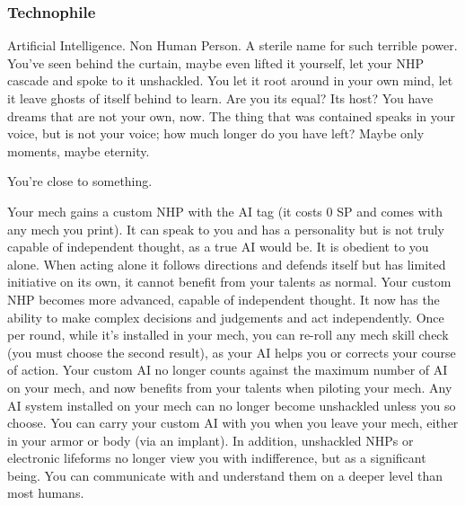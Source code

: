 \subsubsection{Technophile}

\begin{talent}
{Artificial Intelligence. Non Human Person. A sterile name for such terrible power. You’ve seen behind the curtain, maybe even lifted it yourself, let your NHP cascade and spoke to it unshackled. You let it root around in your own mind, let it leave ghosts of itself behind to learn. Are you its equal? Its host? You have dreams that are not your own, now. The thing that was contained speaks in your voice, but is not your voice; how much longer do you have left? Maybe only moments, maybe eternity.

You’re close to something.}

Your mech gains a custom NHP with the AI tag (it costs 0 SP and comes with any mech you print). It can speak to you and has a personality but is not truly capable of independent thought, as a true AI would be. It is obedient to you alone. When acting alone it follows directions and defends itself but has limited initiative on its own, it cannot benefit from your talents as normal. 
Your custom NHP becomes more advanced, capable of independent thought. It now has the ability to make complex decisions and judgements and act independently. Once per round, while it’s installed in your mech, you can re-roll any mech skill check (you must choose the second result), as your AI helps you or corrects your course of action. 
Your custom AI no longer counts against the maximum number of AI on your mech, and now benefits from your talents when piloting your mech. Any AI system installed on your mech can no longer become unshackled unless you so choose. You can carry your custom AI with you when you leave your mech, either in your armor or body (via an implant). In addition, unshackled NHPs or electronic lifeforms no longer view you with indifference, but as a significant being. You can communicate with and understand them on a deeper level than most humans.
\end{talent}